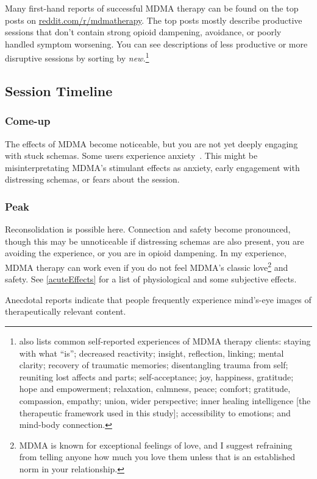 \documentclass[11pt,oneside]{book}
\let\cite\parencite
\begin{document}
Many first-hand reports of successful MDMA therapy can be found on the top posts on \href{https://reddit.com/r/mdmatherapy/top/?sort=top&t=all}{reddit.com/r/mdmatherapy}. The top posts mostly describe productive sessions that don't contain strong opioid dampening, avoidance, or poorly handled symptom worsening. You can see descriptions of less productive or more disruptive sessions by sorting by \textit{new.}\footnote{\textcite{godes2023perceived} also lists common self-reported experiences of MDMA therapy clients: staying with what \enquote{is}; decreased reactivity; insight, reflection, linking; mental clarity; recovery of traumatic memories; disentangling trauma from self; reuniting lost affects and parts; self-acceptance; joy, happiness, gratitude; hope and empowerment; relaxation, calmness, peace; comfort; gratitude, compassion, empathy; union, wider perspective; inner healing intelligence [the therapeutic framework used in this study]; accessibility to emotions; and mind-body connection.}

\subsection*{Session Timeline}
\subsubsection*{Come-up}
The effects of MDMA become noticeable, but you are not yet deeply engaging with stuck schemas. Some users experience anxiety~\cite{hillsSolo}. This might be misinterpretating MDMA's stimulant effects as anxiety, early engagement with distressing schemas, or fears about the session.

\subsubsection*{Peak}
Reconsolidation is possible here. Connection and safety become pronounced, though this may be unnoticeable if distressing schemas are also present, you are avoiding the experience, or you are in opioid dampening. In my experience, MDMA therapy can work even if you do not feel MDMA's classic love\footnote{MDMA is known for exceptional feelings of love, and I suggest refraining from telling anyone how much you love them unless that is an established norm in your relationship.} and safety. See \cref{acuteEffects} for a list of physiological and some subjective effects.

Anecdotal reports indicate that people frequently experience mind's-eye images of therapeutically relevant content.
\end{document}
